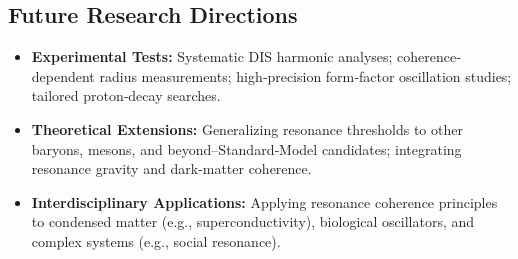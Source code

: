 \subsection{Future Research Directions}
\begin{itemize}
  \item \textbf{Experimental Tests:} Systematic DIS harmonic analyses; coherence‐dependent radius measurements; high‐precision form‐factor oscillation studies; tailored proton‐decay searches.
  \item \textbf{Theoretical Extensions:} Generalizing resonance thresholds to other baryons, mesons, and beyond–Standard‐Model candidates; integrating resonance gravity and dark‐matter coherence.
  \item \textbf{Interdisciplinary Applications:} Applying resonance coherence principles to condensed matter (e.g., superconductivity), biological oscillators, and complex systems (e.g., social resonance).
\end{itemize}

